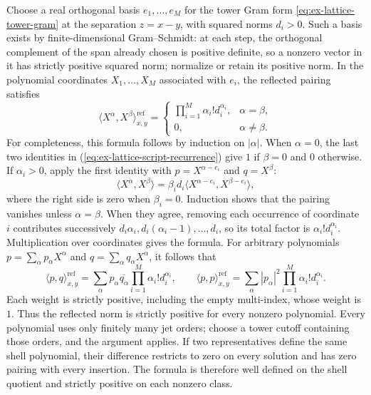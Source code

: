 Choose a real orthogonal basis $e_1,\ldots,e_M$ for the tower Gram form
\eqref{eq:ex-lattice-tower-gram} at the separation $z=x-y$, with squared
norms $d_i>0$. Such a basis
exists by finite-dimensional Gram--Schmidt: at each step, the orthogonal
complement of the span already chosen is positive definite, so a nonzero
vector in it has strictly positive squared norm; normalize or retain its
positive norm. In the polynomial coordinates $X_1,\ldots,X_M$ associated
with $e_i$, the reflected pairing satisfies
\[
 \langle X^\alpha,X^\beta\rangle_{x,y}^{\mathrm{ref}}
 =\begin{cases}
   \displaystyle\prod_{i=1}^M \alpha_i!d_i^{\alpha_i},&\alpha=\beta,\\
   0,&\alpha\ne\beta.
  \end{cases}
\]
For completeness, this formula follows by induction on $|\alpha|$. When
$\alpha=0$, the last two identities in
(\ref{eq:ex-lattice-script-recurrence}) give $1$ if $\beta=0$ and $0$
otherwise. If $\alpha_i>0$, apply the first identity with
$p=X^{\alpha-e_i}$ and $q=X^\beta$:
\[
 \langle X^\alpha,X^\beta\rangle
   =\beta_i d_i\langle X^{\alpha-e_i},X^{\beta-e_i}\rangle,
\]
where the right side is zero when $\beta_i=0$. Induction shows that the
pairing vanishes unless $\alpha=\beta$. When they agree, removing each
occurrence of coordinate $i$ contributes successively
$d_i\alpha_i,d_i(\alpha_i-1),\ldots,d_i$, so its total factor is
$\alpha_i!d_i^{\alpha_i}$. Multiplication over coordinates gives the
formula. For arbitrary polynomials
$p=\sum_\alpha p_\alpha X^\alpha$ and
$q=\sum_\alpha q_\alpha X^\alpha$, it follows that
\begin{equation}\label{eq:ex-lattice-wick-norm}
 \langle p,q\rangle_{x,y}^{\mathrm{ref}}
 =\sum_{\alpha}p_\alpha\overline{q_\alpha}
     \prod_{i=1}^M\alpha_i!d_i^{\alpha_i},
 \qquad
 \langle p,p\rangle_{x,y}^{\mathrm{ref}}
 =\sum_{\alpha}|p_\alpha|^2
     \prod_{i=1}^M\alpha_i!d_i^{\alpha_i}.
\end{equation}
Each weight is strictly positive, including the empty multi-index, whose
weight is $1$. Thus the reflected norm is strictly positive for every
nonzero polynomial. Every polynomial uses only finitely many jet orders;
choose a tower cutoff containing those orders, and the argument applies.
If two representatives define the same shell polynomial, their difference
restricts to zero on every solution and has zero pairing with every
insertion. The formula is therefore well defined on the shell quotient and
strictly positive on each nonzero class.

